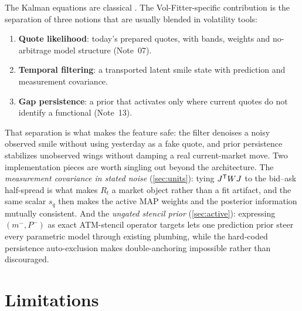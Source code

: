 \documentclass[11pt]{article}
\begin{document}
The Kalman equations are classical \cite{Kalman1960,AndersonMoore1979}. The
Vol-Fitter-specific contribution is the separation of three notions that are
usually blended in volatility tools:
\begin{enumerate}[leftmargin=1.6em]
\item \textbf{Quote likelihood}: today's prepared quotes, with bands, weights
and no-arbitrage model structure (Note~07).
\item \textbf{Temporal filtering}: a transported latent smile state with
prediction and measurement covariance.
\item \textbf{Gap persistence}: a prior that activates only where current
quotes do not identify a functional (Note~13).
\end{enumerate}
That separation is what makes the feature safe: the filter denoises a noisy
observed smile without using yesterday as a fake quote, and prior persistence
stabilizes unobserved wings without damping a real current-market move. Two
implementation pieces are worth singling out beyond the architecture. The
\emph{measurement covariance in stated noise} (\cref{sec:units}): tying
$J^{\mathsf{T}} WJ$ to the bid--ask half-spread is what makes $R_t$ a market object
rather than a fit artifact, and the same scalar $s_q$ then makes the active
MAP weights and the posterior information mutually consistent. And the
\emph{ungated stencil prior} (\cref{sec:active}): expressing $(m^-,P^-)$ as
exact ATM-stencil operator targets lets one prediction prior steer every
parametric model through existing plumbing, while the hard-coded persistence
auto-exclusion makes double-anchoring impossible rather than discouraged.

\section{Limitations}
\label{sec:limits}
\end{document}

